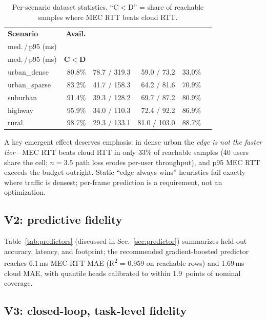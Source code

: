 \documentclass[10pt,conference]{IEEEtran}
\begin{document}
\begin{table}[t]
\centering
\caption{Per-scenario dataset statistics.  ``C$<$D'' = share of reachable
samples where MEC RTT beats cloud RTT.}
\label{tab:dataset}
\scriptsize\setlength{\tabcolsep}{3.4pt}
\begin{tabular}{@{}lrrrrr@{}}
\toprule
\textbf{Scenario} & \textbf{Avail.} & \makecell{\textbf{MEC RTT}\\med.\,/\,p95 (ms)} &
\makecell{\textbf{Cloud RTT}\\med.\,/\,p95 (ms)} & \textbf{C$<$D} \\
\midrule
urban\_dense  & 80.8\% & 78.7 / 319.3 & 59.0 / 73.2  & 33.0\% \\
urban\_sparse & 83.2\% & 41.7 / 158.3 & 64.2 / 81.6  & 70.9\% \\
suburban      & 91.4\% & 39.3 / 128.2 & 69.7 / 87.2  & 80.9\% \\
highway       & 95.9\% & 34.0 / 110.3 & 72.4 / 92.2  & 86.9\% \\
rural         & 98.7\% & 29.3 / 133.1 & 81.0 / 103.0 & 88.7\% \\
\bottomrule
\end{tabular}
\end{table}

A key emergent effect deserves emphasis: in dense urban the \emph{edge
is not the faster tier}---MEC RTT beats cloud RTT in only 33\% of
reachable samples (40 users share the cell; $n=3.5$ path loss erodes
per-user throughput), and p95 MEC RTT exceeds the budget outright.
Static ``edge always wins'' heuristics fail exactly where traffic is
densest; per-frame prediction is a requirement, not an optimization.

\subsection{V2: predictive fidelity}

Table~\ref{tab:predictors} (discussed in Sec.~\ref{sec:predictor})
summarizes held-out accuracy, latency, and footprint;
the recommended gradient-boosted predictor reaches 6.1\,ms MEC-RTT MAE
(R\textsuperscript{2} = 0.959 on reachable rows) and 1.69\,ms cloud MAE,
with quantile heads calibrated to within 1.9~points of nominal coverage.

\subsection{V3: closed-loop, task-level fidelity}
\end{document}

